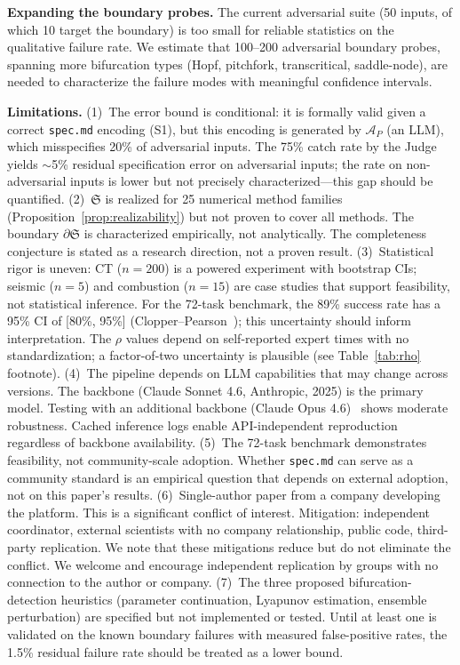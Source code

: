 \documentclass[11pt,a4paper]{article}
\newcommand{\Sclass}{\mathfrak{S}}
\newcommand{\Agent}{\mathcal{A}}
\begin{document}
\textbf{Expanding the boundary probes.} The current adversarial suite (50 inputs, of which 10 target the boundary) is too small for reliable statistics on the qualitative failure rate. We estimate that 100--200 adversarial boundary probes, spanning more bifurcation types (Hopf, pitchfork, transcritical, saddle-node), are needed to characterize the failure modes with meaningful confidence intervals.

\textbf{Limitations.}
(1)~The error bound is conditional: it is formally valid given a correct \texttt{spec.md} encoding (S1), but this encoding is generated by $\Agent_P$ (an LLM), which misspecifies 20\% of adversarial inputs. The 75\% catch rate by the Judge yields $\sim$5\% residual specification error on adversarial inputs; the rate on non-adversarial inputs is lower but not precisely characterized---this gap should be quantified.
(2)~$\Sclass$ is realized for 25 numerical method families (Proposition~\ref{prop:realizability}) but not proven to cover all methods. The boundary $\partial \Sclass$ is characterized empirically, not analytically. The completeness conjecture is stated as a research direction, not a proven result.
(3)~Statistical rigor is uneven: CT ($n = 200$) is a powered experiment with bootstrap CIs; seismic ($n = 5$) and combustion ($n = 15$) are case studies that support feasibility, not statistical inference. For the 72-task benchmark, the 89\% success rate has a 95\% CI of [80\%, 95\%] (Clopper--Pearson~\cite{clopper1934}); this uncertainty should inform interpretation. The $\rho$ values depend on self-reported expert times with no standardization; a factor-of-two uncertainty is plausible (see Table~\ref{tab:rho} footnote).
(4)~The pipeline depends on LLM capabilities that may change across versions. The backbone (Claude Sonnet 4.6, Anthropic, 2025) is the primary model. Testing with an additional backbone (Claude Opus 4.6)~\cite{anthropic2024claude} shows moderate robustness. Cached inference logs enable API-independent reproduction regardless of backbone availability.
(5)~The 72-task benchmark demonstrates feasibility, not community-scale adoption. Whether \texttt{spec.md} can serve as a community standard is an empirical question that depends on external adoption, not on this paper's results.
(6)~Single-author paper from a company developing the platform. This is a significant conflict of interest. Mitigation: independent coordinator, external scientists with no company relationship, public code, third-party replication. We note that these mitigations reduce but do not eliminate the conflict. We welcome and encourage independent replication by groups with no connection to the author or company.
(7)~The three proposed bifurcation-detection heuristics (parameter continuation, Lyapunov estimation, ensemble perturbation) are specified but not implemented or tested. Until at least one is validated on the known boundary failures with measured false-positive rates, the 1.5\% residual failure rate should be treated as a lower bound.
\end{document}
